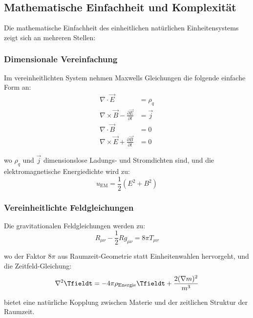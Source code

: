 	\subsection{Mathematische Einfachheit und Komplexität}
	\label{subsec:mathematical_elegance}
	
	Die mathematische Einfachheit des einheitlichen natürlichen Einheitensystems zeigt sich an mehreren Stellen:
	
	\subsubsection{Dimensionale Vereinfachung}
	\label{subsubsec:dimensional_simplification}
	
	Im vereinheitlichten System nehmen Maxwells Gleichungen die folgende einfache Form an:
	\begin{align}
		\nabla \cdot \vec{E} &= \rho_q \\
		\nabla \times \vec{B} - \frac{\partial \vec{E}}{\partial t} &= \vec{j} \\
		\nabla \cdot \vec{B} &= 0 \\
		\nabla \times \vec{E} + \frac{\partial \vec{B}}{\partial t} &= 0
	\end{align}
	
	wo $\rho_q$ und $\vec{j}$ dimensionslose Ladungs- und Stromdichten sind, und die elektromagnetische Energiedichte wird zu:
	\begin{equation}
		u_{\text{EM}} = \frac{1}{2}(E^2 + B^2)
	\end{equation}
	
	\subsubsection{Vereinheitlichte Feldgleichungen}
	\label{subsubsec:unified_field_equations}
	
	Die gravitationalen Feldgleichungen werden zu:
	\begin{equation}
		R_{\mu\nu} - \frac{1}{2}Rg_{\mu\nu} = 8\pi T_{\mu\nu}
	\end{equation}
	
	wo der Faktor $8\pi$ aus Raumzeit-Geometrie statt Einheitenwahlen hervorgeht, und die Zeitfeld-Gleichung:
	\begin{equation}
		\nabla^2 \Tfieldt = -4\pi\rho_{\text{Energie}} \Tfieldt + \frac{2(\nabla m)^2}{m^3}
	\end{equation}
	
	bietet eine natürliche Kopplung zwischen Materie und der zeitlichen Struktur der Raumzeit.
	

